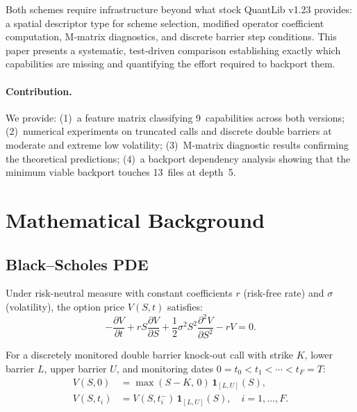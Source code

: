 \documentclass[11pt]{article}
\begin{document}
Both schemes require infrastructure beyond what stock QuantLib v1.23
provides: a spatial descriptor type for scheme selection, modified operator
coefficient computation, M-matrix diagnostics, and discrete barrier step
conditions. This paper presents a systematic, test-driven comparison
establishing exactly which capabilities are missing and quantifying the
effort required to backport them.

\paragraph{Contribution.}
We provide:
(1)~a feature matrix classifying 9~capabilities across both versions;
(2)~numerical experiments on truncated calls and discrete double barriers
    at moderate and extreme low volatility;
(3)~M-matrix diagnostic results confirming the theoretical predictions;
(4)~a backport dependency analysis showing that the minimum viable
    backport touches 13~files at depth~5.

\section{Mathematical Background}
\label{sec:math}

\subsection{Black--Scholes PDE}

Under risk-neutral measure with constant coefficients $r$ (risk-free rate)
and $\sigma$ (volatility), the option price $V(S,t)$ satisfies:
\begin{equation}
  -\frac{\partial V}{\partial t}
  + rS\frac{\partial V}{\partial S}
  + \frac{1}{2}\sigma^2 S^2 \frac{\partial^2 V}{\partial S^2}
  - rV = 0.
  \label{eq:bs}
\end{equation}

For a discretely monitored double barrier knock-out call with strike $K$,
lower barrier $L$, upper barrier $U$, and monitoring dates
$0 = t_0 < t_1 < \cdots < t_F = T$:
\begin{align}
  V(S,0) &= \max(S-K,\,0)\,\mathbf{1}_{[L,U]}(S), \label{eq:ic} \\
  V(S,t_i) &= V(S,t_i^-)\,\mathbf{1}_{[L,U]}(S),
  \quad i=1,\ldots,F.  \label{eq:monitoring}
\end{align}
\end{document}
